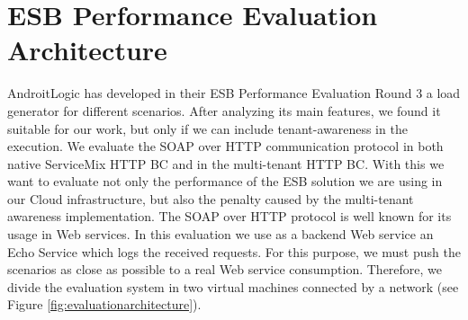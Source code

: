 \section{ESB Performance Evaluation Architecture}
\label{sec:esbevaluationdesign}


AndroitLogic has developed in their \ac{ESB} Performance Evaluation Round 3 a load generator for different scenarios. After analyzing its main features, we found it suitable for our work, but only if we can include tenant-awareness in the execution. We evaluate the \ac{SOAP} over \ac{HTTP} communication protocol in both native ServiceMix \ac{HTTP} \ac{BC} and in the multi-tenant \ac{HTTP} \ac{BC}. With this we want to evaluate not only the performance of the \ac{ESB} solution we are using in our Cloud infrastructure, but also the penalty caused by the multi-tenant awareness implementation. The \ac{SOAP} over \ac{HTTP} protocol is well known for its usage in Web services. In this evaluation we use as a backend Web service an Echo Service which logs the received requests. For this purpose, we must push the scenarios as close as possible to a real Web service consumption. Therefore, we divide the evaluation system in two virtual machines connected by a network (see Figure \ref{fig:evaluationarchitecture}). 


